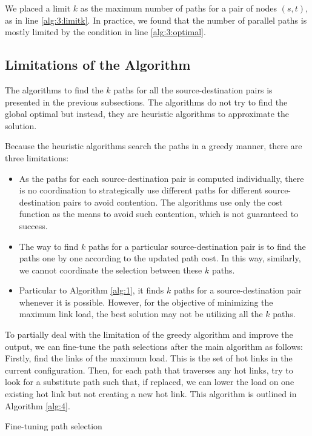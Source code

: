 \documentclass[conference]{IEEEtran}
\begin{document}
We placed a limit $k$ as the maximum number of paths for a pair of nodes
$(s,t)$, as in line \ref{alg:3:limitk}. In practice, we found that the number
of parallel paths is mostly limited by the condition in line
\ref{alg:3:optimal}.

\subsection{Limitations of the Algorithm}

The algorithms to find the $k$ paths for all the source-destination pairs is
presented in the previous subsections. The algorithms do not try to find the global
optimal but instead, they are heuristic algorithms to approximate the solution.

Because the heuristic algorithms search the paths in a greedy manner, there are
three limitations:

\begin{itemize}
\item As the paths for each source-destination pair is computed
	individually, there is no coordination to strategically use different
	paths for different source-destination pairs to avoid contention. The
	algorithms use only the cost function as the means to avoid such
	contention, which is not guaranteed to success.
\item The way to find $k$ paths for a particular source-destination pair is to
	find the paths one by one according to the updated path cost. In this
	way, similarly, we cannot coordinate the selection between these $k$
	paths.
\item Particular to Algorithm \ref{alg:1}, it finds $k$ paths for a
	source-destination pair whenever it is possible. However, for the
	objective of minimizing the maximum link load, the best solution may
	not be utilizing all the $k$ paths.
\end{itemize}

To partially deal with the limitation of the greedy algorithm and improve the
output, we can fine-tune the path selections after the main algorithm as
follows: Firstly, find the links of the maximum load. This is the set of hot
links in the current configuration. Then, for each path that traverses any hot
links, try to look for a substitute path such that, if replaced, we can lower
the load on one existing hot link but not creating a new hot link. This
algorithm is outlined in Algorithm \ref{alg:4}.

\begin{algorithm}
\caption{Fine-tuning path selection}\label{alg:4}
\end{algorithm}
\end{document}
